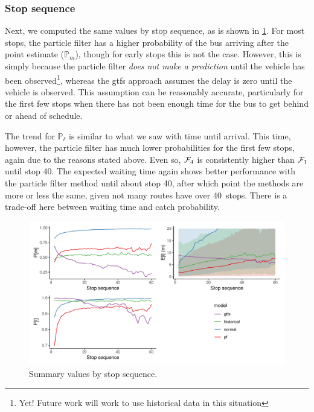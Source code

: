 \subsubsection{Stop sequence}

Next, we computed the same values by stop sequence, as is shown in \cref{fig:model_results_pr_stop}. For most stops, the particle filter has a higher probability of the bus arriving after the point estimate ($\mathbb{P}_m$), though for early stops this is not the case. However, this is simply because the particle filter \emph{does not make a prediction} until the vehicle has been observed\footnote{Yet! Future work will work to use historical data in this situation}, whereas the \gls{gtfs} approach assumes the delay is zero until the vehicle is observed. This assumption can be reasonably accurate, particularly for the first few stops when there has not been enough time for the bus to get behind or ahead of schedule.

The trend for $\mathbb{P}_\ell$ is similar to what we saw with time until arrival. This time, however, the particle filter has much lower probabilities for the first few stops, again due to the reasons stated above. Even so, $\mathcal{F}_4$ is consistently higher than $\mathcal{F}_1$ until stop 40. The expected waiting time again shows better performance with the particle filter method until about stop 40, after which point the methods are more or less the same, given not many routes have over 40~stops. There is a trade-off here between waiting time and catch probability.


\begin{knitrout}\small
{}\color{fgcolor}\begin{figure}
\includegraphics[width=\textwidth]{figure/model_results_pr_stop-1} \caption[Summary values by stop sequence]{Summary values by stop sequence.}\label{fig:model_results_pr_stop}
\end{figure}


\end{knitrout}



